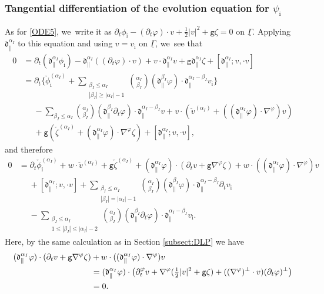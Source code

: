 \documentclass[10pt]{amsart}
\newcommand{\dpar}{{\mathfrak d}_{\parallel}}
\newcommand{\gr}{{\mathtt g}}
\newcommand{\dt}{\partial_t}
\newcommand{\ul}[1]{\underline{#1}}
\newcommand{\itGamma}{\mathit{\Gamma}}
\theoremstyle{definition}
\begin{document}
\subsubsection{Tangential differentiation of the evolution equation for $\psi_\mathrm{i}$}
As for \eqref{ODE5}, we~write it as $\dt\phi_\mathrm{i}-(\dt\varphi)\cdot v+\frac12|v|^2+\gr\zeta=0$ on $\ul{\itGamma}$.
Applying $\dpar^{\alpha_I}$ to this equation and using $v=v_\mathrm{i}$ on $\ul{\itGamma}$, we~see that
\begin{align*}
0 &= \dt(\dpar^{\alpha_I}\phi_\mathrm{i}) - \dpar^{\alpha_I}((\dt\varphi)\cdot v) + v\cdot\dpar^{\alpha_I}v + \gr\dpar^{\alpha_I}\zeta + [\dpar^{\alpha_I};v,\cdot v] \\
&= \dt\biggl\{ \check{\phi}_\mathrm{i}^{(\alpha_I)}
+ \sum_{\substack{\beta_I\leq\alpha_I\\ |\beta_I|\geq|\alpha_I|-1}} \binom{\alpha_I}{\beta_I}(\dpar^{\beta_I}\varphi)\cdot\dpar^{\alpha_I-\beta_I}v_\mathrm{i} \biggr\} \\
&\quad\; - \sum_{\beta_I\leq\alpha_I} \binom{\alpha_I}{\beta_I}(\dpar^{\beta_I}\dt\varphi)\cdot\dpar^{\alpha_I-\beta_I}v
+ v\cdot(\check{v}^{(\alpha_I)}+((\dpar^{\alpha_I}\varphi)\cdot\nabla^\varphi)v) \\
&\quad\; + \gr(\check{\zeta}^{(\alpha_I)}+(\dpar^{\alpha_I}\varphi)\cdot\nabla^\varphi\zeta)+ [\dpar^{\alpha_I};v,\cdot v],
\end{align*}
and therefore
\begin{align*}
0&= \dt\check{\phi}_\mathrm{i}^{(\alpha_I)} + w\cdot\check{v}^{(\alpha_I)} + \gr\check{\zeta}^{(\alpha_I)}
+ (\dpar^{\alpha_I}\varphi)\cdot(\dt v +\gr\nabla^\varphi\zeta) + w\cdot((\dpar^{\alpha_I}\varphi)\cdot\nabla^\varphi)v \\
&\quad\; + [\dpar^{\alpha_I};v,\cdot v]
+ \sum_{\substack{\beta_I\leq\alpha_I\\ |\beta_I|=|\alpha_I|-1}} \binom{\alpha_I}{\beta_I}(\dpar^{\beta_I}\varphi)\cdot\dpar^{\alpha_I-\beta_I}\dt v_\mathrm{i} \\
&\quad\; - \sum_{\substack{\beta_I\leq\alpha_I\\ 1\leq|\beta_I|\leq|\alpha_I|-2}} \binom{\alpha_I}{\beta_I}(\dpar^{\beta_I}\dt\varphi)\cdot\dpar^{\alpha_I-\beta_I}v_\mathrm{i}.
\end{align*}
Here, by the same calculation as in Section \ref{subsect:DLP} we have
\begin{align*}
(\dpar^{\alpha_I}\varphi)\cdot(\dt v +\gr\nabla^\varphi\zeta) &+ w\cdot((\dpar^{\alpha_I}\varphi)\cdot\nabla^\varphi)v \\
&= (\dpar^{\alpha_I}\varphi)\cdot\bigl(\dt^\varphi v + \nabla^\varphi(\tfrac12|v|^2+\mbox{\tt g}\zeta) + ((\nabla^\varphi)^\perp\cdot v)(\dt\varphi)^\perp \bigr) \\
&= 0.
\end{align*}
\end{document}

